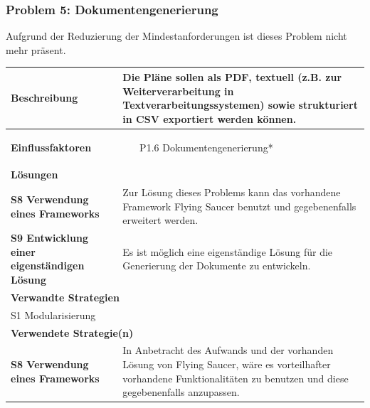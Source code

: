 \documentclass[fontsize=12pt,paper=a4,twoside]{scrartcl}
\begin{document}
\subsubsection{Problem 5: Dokumentengenerierung}

Aufgrund der Reduzierung der Mindestanforderungen ist dieses Problem nicht mehr präsent.\\

\begin{tabularx}{\textwidth}{|p{6cm}|X|}
 \hline
 \textbf{Beschreibung} & 
Die Pläne sollen als PDF, textuell (z.B. zur Weiterverarbeitung in Textverarbeitungssystemen) sowie strukturiert in CSV exportiert werden können. \\\hline
 \textbf{Einflussfaktoren} &
 \begin{itemize}
\item[P1.6] Dokumentengenerierung*
 \end{itemize}\\\hline
\multicolumn{2}{|l|}{\textbf{Lösungen}} \\\hline
\textbf{S8 Verwendung eines Frameworks} & Zur Lösung dieses Problems kann das vorhandene Framework Flying Saucer benutzt und gegebenenfalls erweitert werden. \\\hline
\textbf{S9 Entwicklung einer eigenständigen Lösung} & Es ist möglich eine eigenständige Lösung für die Generierung der Dokumente zu entwickeln. \\\hline
 \multicolumn{2}{|l|}{\textbf{Verwandte Strategien}} \\\hline
  \multicolumn{2}{|l|}{S1 Modularisierung} \\\hline
\multicolumn{2}{|l|}{\textbf{Verwendete Strategie(n)}} \\\hline
 \textbf{S8 Verwendung eines Frameworks}   & In Anbetracht des Aufwands und der vorhanden Lösung von Flying Saucer, wäre es vorteilhafter vorhandene Funktionalitäten zu benutzen und diese gegebenenfalls anzupassen. \\\hline
\end{tabularx}

\newpage
\end{document}
